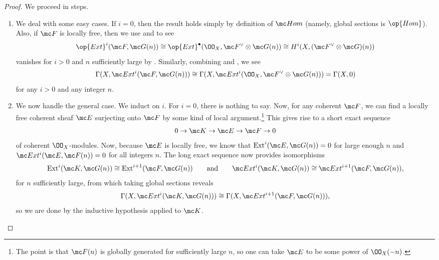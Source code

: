 \documentclass[../notes.tex]{subfiles}
\begin{document}
\begin{proof}
	We proceed in steps.
	\begin{enumerate}
		\item We deal with some easy cases. If $i=0$, then the result holds simply by definition of $\mc Hom$ (namely, global sections is $\op{Hom}$). Also, if $\mc F$ is locally free, then we use  and  to see
		\[\op{Ext}^i(\mc F,\mc G(n))\cong\op{Ext}^\bullet(\OO_X,\mc F^\lor\otimes\mc G(n))\cong H^i(X,(\mc F^\lor\otimes\mc G)(n))\]
		vanishes for $i>0$ and $n$ sufficiently large by . Similarly, combining  and , we see
		\[\Gamma(X,\mc Ext^i(\mc F,\mc G(n)))\cong\Gamma(X,\mc Ext^i(\OO_X,\mc F^\lor\otimes\mc G(n)))=\Gamma(X,0)\]
		for any $i>0$ and any integer $n$.
		\item We now handle the general case. We induct on $i$. For $i=0$, there is nothing to say. Now, for any coherent $\mc F$, we can find a locally free coherent sheaf $\mc E$ surjecting onto $\mc F$ by some kind of local argument.\footnote{The point is that $\mc F(n)$ is globally generated for sufficiently large $n$, so one can take $\mc E$ to be some power of $\OO_X(-n)$.} This gives rise to a short exact sequence
		\[0\to\mc K\to\mc E\to\mc F\to0\]
		of coherent $\OO_X$-modules. Now, because $\mc E$ is locally free, we know that $\mathrm{Ext}^i(\mc E,\mc G(n))=0$ for large enough $n$ and $\mc Ext^i(\mc E,\mc F(n))=0$ for all integers $n$. The long exact sequence now provides isomorphisms
		\[\mathrm{Ext}^i(\mc K,\mc G(n))\cong\mathrm{Ext}^{i+1}(\mc F,\mc G(n))\qquad\text{and}\qquad\mc Ext^i(\mc K,\mc G(n))\cong\mc Ext^{i+1}(\mc F,\mc G(n)),\]
		for $n$ sufficiently large, from which taking global sections reveals
		\[\Gamma(X,\mc Ext^i(\mc K,\mc G(n)))\cong\Gamma(X,\mc Ext^{i+1}(\mc F,\mc G(n))),\]
		so we are done by the inductive hypothesis applied to $\mc K$.
		\qedhere
	\end{enumerate}
\end{proof}
\end{document}
